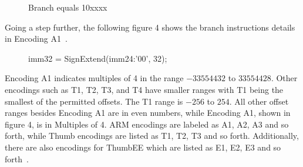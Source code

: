\documentclass[11pt]{report}
\begin{document}
\begin{center}
\begin{figure}[H] 
\caption{Branch equals 10xxxx}
\end{figure}
\end{center}
\begin{doublespace}
Going a step further, the following figure 4 shows the branch instructions details in Encoding A1~\citep[A8-44]{referenceB}.
\end{doublespace}
\begin{center}
\begin{figure}[H] 
\caption{imm32 = SignExtend(imm24:'00', 32);}
\end{figure}
\end{center}
\begin{doublespace}
Encoding A1 indicates multiples of 4 in the range $-33554432$ to $33554428$. Other encodings such as T1, T2, T3, and T4 have smaller ranges with T1 being the smallest of the permitted offsets. The T1 range is $-256$ to $254$. All other offset ranges besides Encoding A1 are in even numbers, while Encoding A1, shown in figure 4, is in Multiples of 4. ARM encodings are labeled as A1, A2, A3 and so forth, while Thumb encodings are listed as T1, T2, T3 and so forth. Additionally, there are also encodings for ThumbEE which are listed as E1, E2, E3 and so forth~\citep[A8-282]{referenceB}. 
\end{doublespace}
\end{document}
